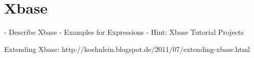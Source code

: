 \section{Xbase}

- Describe Xbase
- Examples for Expressions
- Hint: Xbase Tutorial Projects

Extending Xbase: http://koehnlein.blogspot.de/2011/07/extending-xbase.html
